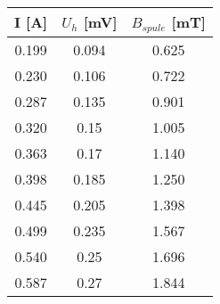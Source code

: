 \begin{minipage}[h]{0.35\linewidth}

\begin{tabular}{|c|c|c|}
\hline 
I [A] & $U_h$ [mV] & $B_{spule}$ [mT] \\ 
\hline 
0.199 & 0.094 & 0.625
 \\ 
\hline 
0.230 & 0.106 & 0.722
 \\ 
\hline 
0.287 & 0.135 & 0.901
 \\ 
\hline 
0.320 & 0.15 & 1.005
 \\ 
\hline 
0.363 & 0.17 & 1.140
 \\ 
\hline 
0.398 & 0.185 & 1.250
 \\ 
\hline 
0.445 & 0.205 & 1.398
 \\ 
\hline 
0.499 & 0.235 & 1.567
 \\ 
\hline 
0.540 & 0.25 & 1.696
 \\ 
\hline 
0.587 & 0.27 & 1.844
 \\ 
\hline 
\end{tabular} 
\label{tab:eichspule}

\end{minipage}
\hfill
